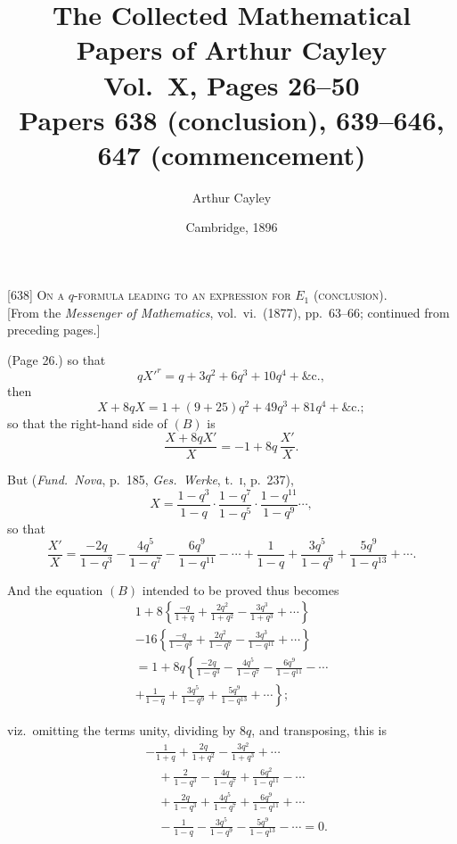 \documentclass[11pt,a4paper]{article}
\title{The Collected Mathematical Papers of Arthur Cayley\\[6pt]
\large Vol.~X, Pages 26--50 \\[4pt]
\normalsize Papers 638 (conclusion), 639--646, 647 (commencement)}
\author{Arthur Cayley}
\date{Cambridge, 1896}
\begin{document}
\maketitle
\thispagestyle{fancy}

\setcounter{page}{26}


\begin{center}
\textsc{[638] On a $q$-formula leading to an expression for $E_1$ (conclusion).}\\[0.5em]
[From the \textit{Messenger of Mathematics}, vol.~vi.\ (1877), pp.~63--66; continued from preceding pages.]
\end{center}

\medskip

\noindent (Page 26.) so that
\[
q X'^r = q + 3q^2 + 6q^3 + 10q^4 + \&\text{c.},
\]
then
\[
X + 8qX = 1 + (9 + 25)q^2 + 49q^3 + 81q^4 + \&\text{c.};
\]
so that the right-hand side of $(B)$ is
\[
\frac{X + 8qX'}{X} = -1 + 8q\,\frac{X'}{X}.
\]

But (\textit{Fund.\ Nova}, p.\ 185, \textit{Ges.\ Werke}, t.\ \textsc{i}, p.\ 237),
\[
X = \frac{1 - q^3}{1 - q} \cdot \frac{1 - q^7}{1 - q^5} \cdot \frac{1 - q^{11}}{1 - q^9} \cdots,
\]
so that
\[
\frac{X'}{X} = \frac{-2q}{1 - q^3} - \frac{4q^5}{1 - q^7} - \frac{6q^9}{1 - q^{11}} - \cdots
+ \frac{1}{1 - q} + \frac{3q^5}{1 - q^9} + \frac{5q^9}{1 - q^{13}} + \cdots.
\]

And the equation $(B)$ intended to be proved thus becomes
\begin{align*}
1 + 8 \left\{ \frac{-q}{1 + q} + \frac{2q^2}{1 + q^2} - \frac{3q^3}{1 + q^3} + \cdots \right\} \\
- 16 \left\{ \frac{-q}{1 - q^3} + \frac{2q^2}{1 - q^7} - \frac{3q^3}{1 - q^{11}} + \cdots \right\} \\
= 1 + 8q \left\{ \frac{-2q}{1 - q^3} - \frac{4q^5}{1 - q^7} - \frac{6q^9}{1 - q^{11}} - \cdots \right. \\
\left. + \frac{1}{1 - q} + \frac{3q^5}{1 - q^9} + \frac{5q^9}{1 - q^{13}} + \cdots \right\};
\end{align*}

viz.\ omitting the terms unity, dividing by $8q$, and transposing, this is
\begin{align*}
& -\frac{1}{1 + q} + \frac{2q}{1 + q^2} - \frac{3q^2}{1 + q^3} + \cdots \\
& \quad + \frac{2}{1 - q^3} - \frac{4q}{1 - q^7} + \frac{6q^2}{1 - q^{11}} - \cdots \\
& \quad + \frac{2q}{1 - q^3} + \frac{4q^5}{1 - q^7} + \frac{6q^9}{1 - q^{11}} + \cdots \\
& \quad - \frac{1}{1 - q} - \frac{3q^5}{1 - q^9} - \frac{5q^9}{1 - q^{13}} - \cdots = 0.
\end{align*}
\end{document}
